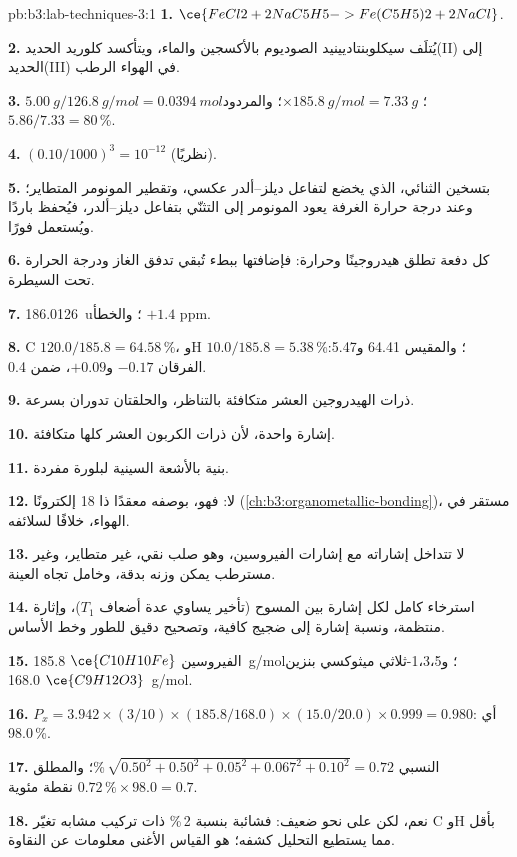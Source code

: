 \begin{solution}{pb:b3:lab-techniques-3:1}
\textbf{1.} $\ce{FeCl2 + 2NaC5H5 -> Fe(C5H5)2 + 2NaCl}$.

\textbf{2.} يُتلَف سيكلوبنتاديينيد الصوديوم بالأكسجين والماء، ويتأكسد كلوريد الحديد(II)
إلى الحديد(III) في الهواء الرطب.

\textbf{3.} $\qty{5.00}{g}/\qty{126.8}{g/mol} = \qty{0.0394}{mol}$؛ $\times \qty{185.8}{g/mol} = \qty{7.33}{g}$؛ والمردود $5.86/7.33 = 80$\,\%.

\textbf{4.} $(0.10/1000)^3 = 10^{-12}$ (نظريًا).

\textbf{5.} بتسخين الثنائي، الذي يخضع لتفاعل ديلز--ألدر عكسي، 
وتقطير المونومر المتطاير؛ وعند درجة حرارة الغرفة يعود المونومر إلى التثنّي
بتفاعل ديلز--ألدر، فيُحفظ باردًا ويُستعمل فورًا.

\textbf{6.} كل دفعة تطلق هيدروجينًا وحرارة: فإضافتها ببطء تُبقي تدفق
الغاز ودرجة الحرارة تحت السيطرة.

\textbf{7.} \qty{186.0126}{u}؛ والخطأ $+1.4$ ppm.

\textbf{8.} C $120.0/185.8 = 64.58$\,\%، وH $10.0/185.8 = 5.38$\,\%؛ والمقيس 64.41 و5.47: الفرقان $-0.17$ و$+0.09$، ضمن 0.4.

\textbf{9.} ذرات الهيدروجين العشر متكافئة بالتناظر، والحلقتان تدوران بسرعة.

\textbf{10.} إشارة واحدة، لأن ذرات الكربون العشر كلها متكافئة.

\textbf{11.} بنية بالأشعة السينية لبلورة مفردة.

\textbf{12.} لا: فهو، بوصفه معقدًا ذا 18 إلكترونًا (\cref{ch:b3:organometallic-bonding})، مستقر في الهواء، خلافًا
لسلائفه.

\textbf{13.} لا تتداخل إشاراته مع إشارات الفيروسين، وهو صلب نقي، غير متطاير،
وغير مسترطب يمكن وزنه بدقة، وخامل تجاه
العينة.

\textbf{14.} استرخاء كامل لكل إشارة بين المسوح (تأخير يساوي عدة أضعاف $T_1$)،
وإثارة منتظمة، ونسبة إشارة إلى ضجيج كافية، وتصحيح دقيق للطور وخط
الأساس.

\textbf{15.} الفيروسين $\ce{C10H10Fe}$ \qty{185.8}{g/mol}؛ و1،3،5-ثلاثي ميثوكسي بنزين $\ce{C9H12O3}$ \qty{168.0}{g/mol}.

\textbf{16.} $P_x = 3.942 \times (3/10) \times (185.8/168.0) \times (15.0/20.0) \times 0.999 = 0.980$: أي 98.0\,\%.

\textbf{17.} النسبي $\sqrt{0.50^2 + 0.50^2 + 0.05^2 + 0.067^2 + 0.10^2} = 0.72$\,\%؛ والمطلق $0.72\,\% \times 98.0 = 0.7$ نقطة مئوية.

\textbf{18.} نعم، لكن على نحو ضعيف: فشائبة بنسبة 2\,\% ذات تركيب مشابه تغيّر C وH بأقل
مما يستطيع التحليل كشفه؛  هو القياس الأغنى معلومات عن النقاوة.


\end{solution}

